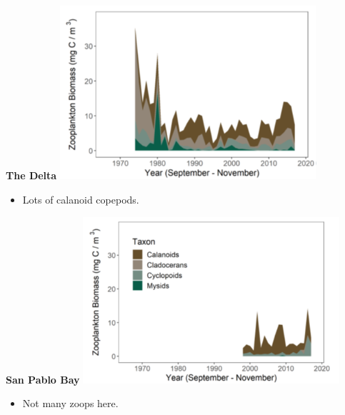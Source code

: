 \documentclass[]{article}\usepackage[]{graphicx}\usepackage[]{color}
\begin{document}
\vspace{1cm}

\begin{Row}
  \begin{Cell}{7}
    \begin{center}
      {\bf {\large The Delta}}
      \includegraphics[width=9.5cm,align=m]{figures/zoop/zoop_delta_tmp.png}
      \vspace{0.5cm}
      \begin{itemize}[leftmargin=2cm,rightmargin=0.5cm]
        \item Lots of calanoid copepods.
      \end{itemize}
    \end{center}
  \end{Cell}
  \begin{Cell}{6}
    \begin{center}
      {\bf {\large San Pablo Bay}}
      \includegraphics[width=9.5cm,align=m]{figures/zoop/zoop_san_pablo_bay_tmp.png}
      \vspace{0.5cm}
      \begin{itemize}[leftmargin=2cm,rightmargin=0.5cm]
        \item Not many zoops here.
      \end{itemize}
    \end{center}
  \end{Cell}
\end{Row}
\end{document}
